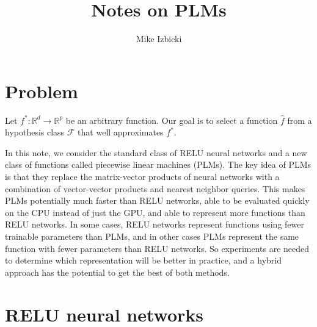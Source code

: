\documentclass{article}
\title{Notes on PLMs}
\author{Mike Izbicki}
\DeclareMathOperator*{\argmin}{arg\,min}
\DeclareMathOperator*{\E}{\mathbb{E}}
\newcommand{\R}{\mathbb{R}}
\newcommand{\F}{\mathcal{F}}
\newcommand{\D}{\mathcal{D}}
\newcommand{\x}{\mathbf{x}}
\newcommand{\f}{f}
\newcommand{\fstar}{\f^*}
\newcommand{\fhat}{{\hat\f}}
\newcommand{\loss}{\ell}
\begin{document}
\maketitle

\section{Problem} 

Let $\fstar : \R^{d} \to \R^{p}$ be an arbitrary function.
Our goal is to select a function $\fhat$ from a hypothesis class $\F$ that well approximates $\fstar$.

In this note, we consider the standard class of RELU neural networks and a new class of functions called piecewise linear machines (PLMs).
The key idea of PLMs is that they replace the matrix-vector products of neural networks with a combination of vector-vector products and nearest neighbor queries.
This makes PLMs potentially much faster than RELU networks,
able to be evaluated quickly on the CPU instead of just the GPU,
and able to represent more functions than RELU networks.
In some cases, RELU networks represent functions using fewer trainable parameters than PLMs,
and in other cases PLMs represent the same function with fewer parameters than RELU networks.
So experiments are needed to determine which representation will be better in practice,
and a hybrid approach has the potential to get the best of both methods.

\section{RELU neural networks}
\end{document}
